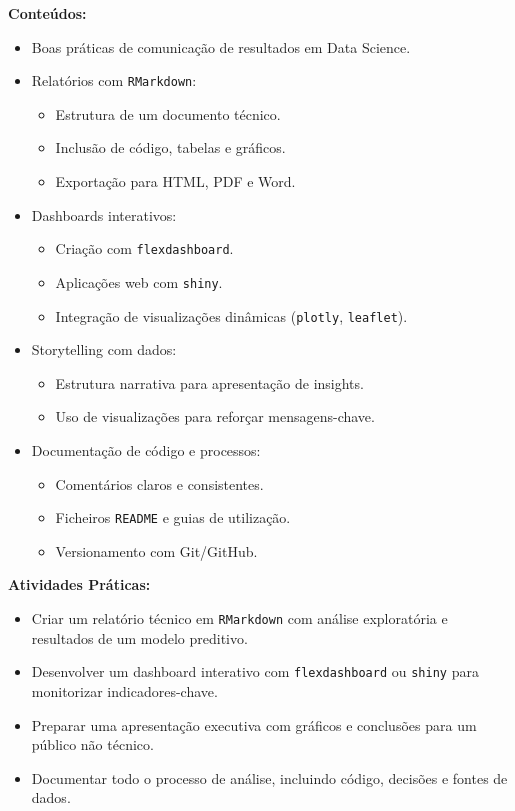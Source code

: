 \documentclass[12pt]{article}
\begin{document}
\textbf{Conteúdos:}
\begin{itemize}
  \item Boas práticas de comunicação de resultados em Data Science.
  \item Relatórios com \texttt{RMarkdown}:
    \begin{itemize}
      \item Estrutura de um documento técnico.
      \item Inclusão de código, tabelas e gráficos.
      \item Exportação para HTML, PDF e Word.
    \end{itemize}
  \item Dashboards interativos:
    \begin{itemize}
      \item Criação com \texttt{flexdashboard}.
      \item Aplicações web com \texttt{shiny}.
      \item Integração de visualizações dinâmicas (\texttt{plotly}, \texttt{leaflet}).
    \end{itemize}
  \item Storytelling com dados:
    \begin{itemize}
      \item Estrutura narrativa para apresentação de insights.
      \item Uso de visualizações para reforçar mensagens-chave.
    \end{itemize}
  \item Documentação de código e processos:
    \begin{itemize}
      \item Comentários claros e consistentes.
      \item Ficheiros \texttt{README} e guias de utilização.
      \item Versionamento com Git/GitHub.
    \end{itemize}
\end{itemize}

\textbf{Atividades Práticas:}
\begin{itemize}
  \item Criar um relatório técnico em \texttt{RMarkdown} com análise exploratória e resultados de um modelo preditivo.
  \item Desenvolver um dashboard interativo com \texttt{flexdashboard} ou \texttt{shiny} para monitorizar indicadores-chave.
  \item Preparar uma apresentação executiva com gráficos e conclusões para um público não técnico.
  \item Documentar todo o processo de análise, incluindo código, decisões e fontes de dados.
\end{itemize}
\end{document}
